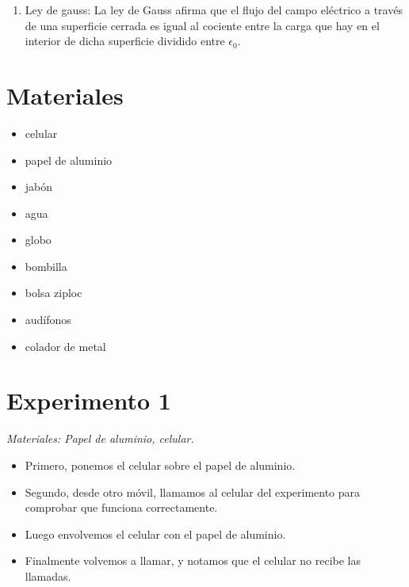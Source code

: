 \documentclass[]{article}
\begin{document}
\begin{multicols*}{2}[\setlength{columnsep}{3cm}]
\begin{enumerate}
    \item Ley de gauss: La ley de Gauss afirma que el flujo del campo eléctrico a través de una superficie cerrada es igual al cociente entre la carga que hay en el interior de dicha superficie dividido entre $\epsilon_0$.
\end{enumerate}




\section*{Materiales}


\begin{itemize}
    \item celular
    \item papel de aluminio
    \item jabón
    \item agua
    \item globo
    \item bombilla
    \item bolsa ziploc
    \item audífonos
    \item colador de metal 
\end{itemize}




\section*{Experimento 1}
\textit{Materiales: Papel de aluminio, celular.}


\begin{itemize}
    \item Primero, ponemos el celular sobre el papel de aluminio.
    \item Segundo, desde otro móvil, llamamos al celular del experimento para comprobar que funciona correctamente.
    \item Luego envolvemos el celular con el papel de aluminio.
    \item Finalmente volvemos a llamar, y notamos que el celular no recibe las llamadas.
\end{itemize}



\end{multicols*}
\end{document}
